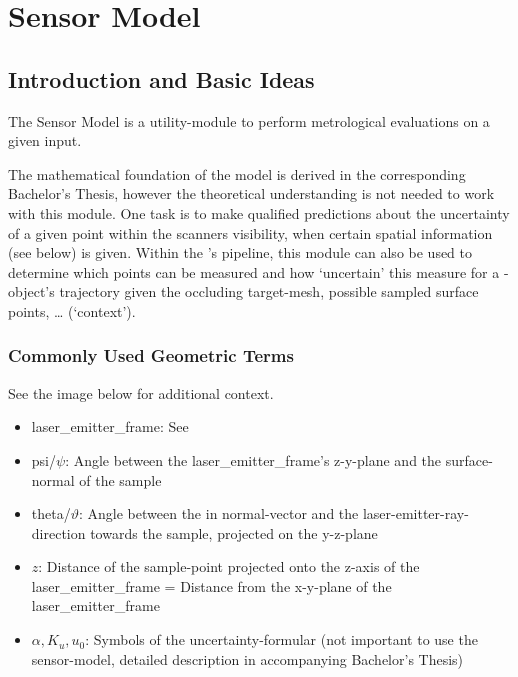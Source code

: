 \documentclass[letterpaper,10pt,english]{sphinxmanual}
\begin{document}
\chapter{Sensor Model}
\label{\detokenize{module_sensor_model::doc}}\label{\detokenize{module_sensor_model:sensor-model}}\label{\detokenize{module_sensor_model:id1}}

\section{Introduction and Basic Ideas}
\label{\detokenize{module_sensor_model:introduction-and-basic-ideas}}
The Sensor Model is a utility-module to perform metrological evaluations on a given input.

The mathematical foundation of the model is derived in the corresponding
Bachelor’s Thesis, however the theoretical understanding is not needed to work with this module. One task is to make qualified predictions about the uncertainty
of a given point within the scanners visibility, when certain spatial information (see below) is given. Within the {\hyperref[\detokenize{module_trajectory_manager:trajectory-manager}]{}}’s pipeline, this module
can also be used to determine which points can be measured and how ‘uncertain’ this measure for a {\hyperref[\detokenize{module_view:viewpoint}]{}}-object’s trajectory given the occluding target-mesh,
possible sampled surface points, … (‘context’).


\subsection{Commonly Used Geometric Terms}
\label{\detokenize{module_sensor_model:commonly-used-geometric-terms}}
See the image below for additional context.
\begin{itemize}
\item {} 
laser\_emitter\_frame: See {\hyperref[\detokenize{module_view:viewpoint}]{}}

\item {} 
psi/\(\psi\): Angle between the laser\_emitter\_frame’s z-y-plane and the surface-normal of the sample

\item {} 
theta/\(\vartheta\):  Angle between the in normal-vector and the laser-emitter-ray-direction towards the sample, projected on the y-z-plane

\item {} 
\(z\): Distance of the sample-point projected onto the z-axis of the laser\_emitter\_frame = Distance from the x-y-plane of the laser\_emitter\_frame

\item {} 
\(\alpha, K_{u}, u_{0}\): Symbols of the uncertainty-formular (not important to use the sensor-model, detailed description in accompanying Bachelor’s Thesis)

\end{itemize}
\end{document}
